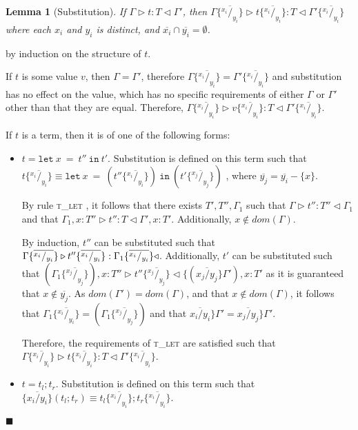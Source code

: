 \documentclass{article}
\newtheorem{lem}{Lemma}
\newcommand{\tlet}{\textsc{t\_let} }
\newcommand{\typerule}[4]{#1 \triangleright #2 : #3 \triangleleft #4}
\newcommand{\subst}[3]{#3 \{\overline{^{#1}/_{#2}}\}}
\newcommand{\lett}[3]{\mathtt{let}\:#1\:\mathtt{=}\:#2\:\mathtt{in}\:#3}
\newcommand{\qed}{$\blacksquare$}
\newenvironment{proof}{\vspace{1ex}\noindent{\bf Proof}\hspace{0.5em}}
  {\hfill\qed\vspace{1ex}}
\begin{document}
\begin{lem}[Substitution]
If $\typerule{\Gamma}{t}{T}{\Gamma'}$, then
$\typerule
{\subst{x_i}{y_i}{\Gamma}}
{\subst{x_i}{y_i}{t}}
{T}
{\subst{x_i}{y_i}{\Gamma'}}$
where each $x_i$ and $y_i$ is distinct, and $\overline{x_i} \cap \overline{y_i} = \emptyset$.
\end{lem}
\begin{proof}
by induction on the structure of $t$.

If $t$ is some value $v$, then $\Gamma = \Gamma'$, therefore
$\subst{x_i}{y_i}{\Gamma} = \subst{x_i}{y_i}{\Gamma'}$
and substitution has no effect on the value, which has no specific requirements
of either $\Gamma$ or $\Gamma'$ other than that they are equal.
Therefore, $\typerule{\subst{x_i}{y_i}{\Gamma}}{\subst{x_i}{y_i}{v}}{T}{\subst{x_i}{y_i}{\Gamma'}}$.

If $t$ is a term, then it is of one of the following forms:

\begin{itemize}
\item $t = \lett{x}{t''}{t'}$. 
Substitution is defined on this term such that \\
$\subst{x_i}{y_i}{t} \equiv 
\lett{x}{( \subst{x_i}{y_i}{t''} )}{(\subst{x_j}{y_j}{t'})}$
, where $\overline{y_j} = \overline{y_i} - \{ x \}$.

By rule \tlet, it follows
that there exists $T', T'', \Gamma_1$ such that
$\typerule{\Gamma}{t''}{T''}{\Gamma_1}$ and that
$\typerule{\Gamma_1, x : T''}{t''}{T}{\Gamma', x : T'}$.
Additionally, $x \notin dom(\Gamma)$.

By induction, $t''$ can be substituted such that 
$\typerule
{\subst{x_i}{y_i}{\Gamma}}
{\subst{x_i}{y_i}{t''}}
{\subst{x_i}{y_i}{\Gamma_1}}
$.
Additionally, $t'$ can be substituted such that
$(\subst{x_j}{y_j}{\Gamma_1}) , x : T'' \triangleright \subst{x_j}{y_j}{t''} \triangleleft \{ (\overline{x_j / y_j} \} \Gamma') , x : T'$ as it is guaranteed that $x \notin \overline{y_j}$.
As $dom(\Gamma') = dom(\Gamma)$, and that $x \notin dom(\Gamma)$, it follows that $\subst{x_i}{y_i}{\Gamma_1} = (\subst{x_j}{y_j}{\Gamma_1})$ and
that $\overline{x_i / y_i} \} \Gamma' = \overline{x_j / y_j} \} \Gamma'$.

Therefore, the requirements of \tlet are satisfied such that
$\typerule{\subst{x_i}{y_i}{\Gamma}}{\subst{x_i}{y_i}{t}}{T}{\subst{x_i}{y_i}{\Gamma'}}$.

\item $t = t_l ; t_r$.
Substitution is defined on this term such that
$\{ \overline{x_i / y_i} \} ( t_l ; t_r ) \equiv \subst{x_i}{y_i}{t_l} ; \subst{x_i}{y_i}{t_r}$.


\end{itemize}
\end{proof}
\end{document}
